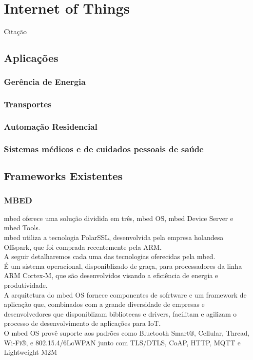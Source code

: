 \section{Internet of Things}
\label{sec:IoT}
Citação~\cite{COMPaaS}

\subsection{Aplicações}
\label{sec:IoTAp}
\subsubsection{Gerência de Energia}
\subsubsection{Transportes}
\subsubsection{Automação Residencial}
\subsubsection{Sistemas médicos e de cuidados pessoais de saúde}

\subsection{Frameworks Existentes}
\label{sec:IoTFrameworks}
\subsubsection{MBED}
mbed \cite{mbed} oferece uma solução dividida em três, mbed OS, mbed Device Server e mbed Tools.\\
mbed utiliza a tecnologia PolarSSL, desenvolvida pela empresa holandesa Offspark, que foi comprada recentemente pela ARM.\\
A seguir detalharemos cada uma das tecnologias oferecidas pela mbed.\\
É um sistema operacional, disponiblizado de graça, para processadores da linha ARM Cortex-M, que são desenvolvidos visando a eficiência de energia e produtividade.\\
A arquitetura do mbed OS fornece componentes de sofrtware e um framework de aplicação que, combinados com a grande diversidade de empresas e desenvolvedores que disponiblizam bibliotecas e drivers, facilitam e agilizam o processo de desenvolvimento de aplicações para IoT.\\
O mbed OS provê suporte aos padrões como Bluetooth Smart®, Cellular, Thread, Wi-Fi®, e 802.15.4/6LoWPAN junto com TLS/DTLS, CoAP, HTTP, MQTT e Lightweight M2M

